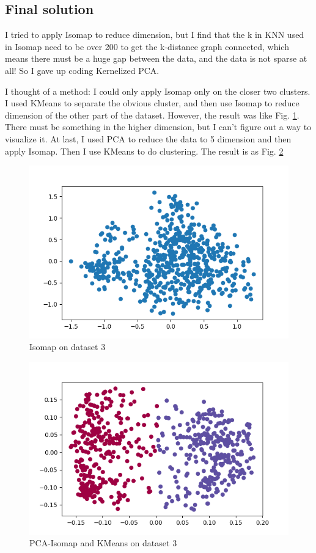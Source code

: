 \documentclass[conference]{IEEEtran}
\begin{document}
\subsection{Final solution}
I tried to apply Isomap to reduce dimension, but I find that the k in KNN used in Isomap need to be over 200 to get the k-distance graph connected, which means there must be a huge gap between the data, and the data is not sparse at all! So I gave up coding Kernelized PCA.

I thought of a method: I could only apply Isomap only on the closer two clusters. I used KMeans to separate the obvious cluster, and then use Isomap to reduce dimension of the other part of the dataset. However, the result was like Fig. \ref{P3IsoR}. There must be something in the higher dimension, but I can't figure out a way to visualize it. At last, I used PCA to reduce the data to 5 dimension and then apply Isomap. Then I use KMeans to do clustering. The result is as Fig. \ref{P3IsoK}

\begin{figure}[htbp]
	\centerline{\includegraphics[scale=0.5]{P3IsoR.png}}
	\caption{Isomap on dataset 3}
	\label{P3IsoR}
\end{figure}

\begin{figure}[htbp]
	\centerline{\includegraphics[scale=0.5]{P3IsoK.png}}
	\caption{PCA-Isomap and KMeans on dataset 3}
	\label{P3IsoK}
\end{figure}
\end{document}
